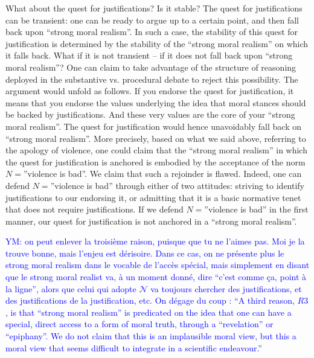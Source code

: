 \documentclass[preprint, french, english, 11pt, authoryear]{elsarticle}%
\newcommand{\commentYM}[1]{\textcolor{blue}{YM: #1}}
\newcommand{\adv}{\mathscr{N}}
\begin{document}
What about the quest for justifications? Is it stable? The quest for justifications can be transient: one can be ready to argue up to a certain point, and then fall back upon ``strong moral realism''. In such a case, the stability of this quest for justification is determined by the stability of the ``strong moral realism'' on which it falls back. What if it is not transient -- if it does not fall back upon ``strong moral realism''? One can claim to take advantage of the structure of reasoning deployed in the substantive vs. procedural debate to reject this possibility. The argument would unfold as follows. If you endorse the quest for justification, it means that you endorse the values underlying the idea that moral stances should be backed by justifications. And these very values are the core of your ``strong moral realism''. The quest for justification would hence unavoidably fall back on ``strong moral realism''. More precisely, based on what we said above, referring to the apology of violence, one could claim that the ``strong moral realism'' in which the quest for justification is anchored is embodied by the acceptance of the norm $N=$''violence is bad''. We claim that such a rejoinder is flawed. Indeed, one can defend $N=$''violence is bad'' through either of two attitudes: striving to identify justifications to our endorsing it, or admitting that it is a basic normative tenet that does not require justifications. If we defend $N=$''violence is bad'' in the first manner, our quest for justification is not anchored in a ``strong moral realism''. 

\commentYM{on peut enlever la troisième raison, puisque que tu ne l'aimes pas. Moi je la trouve bonne, mais l'enjeu est dérisoire. Dans ce cas, on ne présente plus le strong moral realism dans le vocable de l'accès spécial, mais simplement en disant que le strong moral realist va, à un moment donné, dire ``c'est comme ça, point à la ligne'', alors que celui qui adopte $\adv$ va toujours chercher des justifications, et des justifications de la justification, etc. On dégage du coup : ``A third reason, $R3$, is that ``strong moral realism'' is predicated on the idea that one can have a special, direct access to a form of moral truth, through a ``revelation'' or ``epiphany''. We do not claim that this is an implausible moral view, but this a moral view that seems difficult to integrate in a scientific endeavour.''} 
\end{document}
